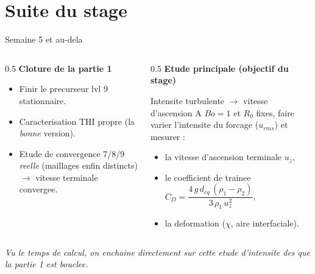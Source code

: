 \documentclass[11pt,aspectratio=169]{beamer}
\begin{document}
\section{Suite du stage}
\begin{frame}{Semaine 5 et au-dela}
  \begin{columns}[T]
    \begin{column}{0.5\textwidth}
      \textbf{Cloture de la partie 1}
      \begin{itemize}
        \item Finir le precurseur lvl 9 stationnaire.
        \item Caracterisation THI propre (la \emph{bonne} version).
        \item Etude de convergence 7/8/9 \emph{reelle} (maillages enfin
              distincts) $\to$ vitesse terminale convergee.
      \end{itemize}
    \end{column}
    \begin{column}{0.5\textwidth}
      \textbf{Etude principale (objectif du stage)}
      \begin{block}{Intensite turbulente $\to$ vitesse d'ascension}
        \footnotesize
        A $Bo=1$ et $R_0$ fixes, faire varier l'intensite du forcage
        ($u_{rms}$) et mesurer :
        \begin{itemize}
          \item la vitesse d'ascension terminale $u_z$,
          \item le coefficient de trainee
                $C_D = \dfrac{4\,g\,d_{eq}\,(\rho_1-\rho_2)}{3\,\rho_1\,u_z^2}$,
          \item la deformation ($\chi$, aire interfaciale).
        \end{itemize}
      \end{block}
    \end{column}
  \end{columns}
  \vspace{0.3em}
  \begin{center}
    \footnotesize\itshape
    Vu le temps de calcul, on enchaine directement sur cette etude d'intensite
    des que la partie 1 est bouclee.
  \end{center}
\end{frame}
\end{document}
